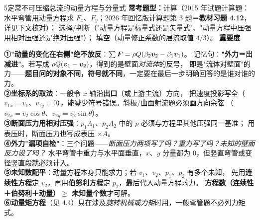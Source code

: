 \begin{kaodian}{5}{定常不可压缩总流的动量方程与分量式}
\textbf{常考题型：}计算（2015 年试题计算题：水平弯管用动量方程求 $F_x$、$F_y$；2026 年回忆版计算题第 3 题＝\textbf{教材习题 4.12}，详见下文核对）；
选择/判断（"动量方程是标量式还是矢量式"、"动量方程中压强用相对压强还是绝对压强"）；
填空（动量修正系数的层流取值 $4/3$）。
\textbf{重要度 }\quad{}\quad{}

\begin{banfa}
\textbf{①"动量的变化在右侧"绝不放反}：$\sum\bm{F}=\rho Q(\beta_2\bm{v}_2-\beta_1\bm{v}_1)$。
记忆句：\textbf{"外力＝出减进"}。若写成 $\rho Q(\bm{v}_1-\bm{v}_2)$，得到的是壁面\emph{对流体}的反号，
即是"流体对壁面"的力——\textbf{题目问的对象不同，符号就不同}，一定要在最后一步明确回答的是谁对谁的力。\\
\textbf{②坐标系的取法}：一般令 $x$ 轴沿\textbf{出口}（或上游主流）方向，
把速度投影写全（$v_{1x}=v_1$、$v_{1y}=0$），能减少符号错误。斜板/曲面射流题必须画方向余弦
（$v_{2x}=v_2\cos\theta$、$v_{2y}=v_2\sin\theta$）。\\
\textbf{③断面压力用相对压强}：$p_1A_1$、$p_2A_2$ 中的 $p$ 必须与方程里其他压强同一基准；
用表压时，断面压力也写成表压 $\times A$。\\
\textbf{④外力"漏项自检"}：三个问题——\emph{断面压力两项写了吗？重力写了吗？未知的壁面反力设了吗？}
水平弯管中重力与水平面垂直，$x$、$y$ 分量都为 0，但竖直弯管或变径竖直段就必须计入。\\
\textbf{⑤未知数配平}：动量方程本身只能求力；若 $v_1$、$v_2$、$p_1$、$p_2$ 有多个未知，
先用\textbf{连续性方程}定 $v_2$，再用\textbf{伯努利方程}定 $p_2$，最后代入动量方程求力。
\textbf{方程数（连续性＋伯努利＋动量）$\ge$ 未知量个数}才可解。\\
\textbf{⑥动量矩方程}（见 4.4）只在涉及\emph{旋转机械或力矩}时用，一般弯管题不必列力矩式。
\end{banfa}
\end{kaodian}


